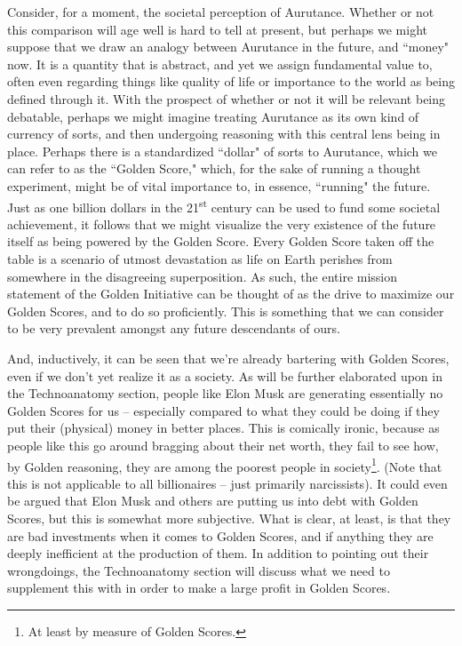 Consider, for a moment, the societal perception of Aurutance. Whether or not this comparison will age well is hard to tell at present, but perhaps we might suppose that we draw an analogy between Aurutance in the future, and ``money" now. It is a quantity that is abstract, and yet we assign fundamental value to, often even regarding things like quality of life or importance to the world as being defined through it. With the prospect of whether or not it will be relevant being debatable, perhaps we might imagine treating Aurutance as its own kind of currency of sorts, and then undergoing reasoning with this central lens being in place. Perhaps there is a standardized ``dollar" of sorts to Aurutance, which we can refer to as the ``Golden Score," which, for the sake of running a thought experiment, might be of vital importance to, in essence, ``running" the future. Just as one billion dollars in the 21\textsuperscript{st} century can be used to fund some societal achievement, it follows that we might visualize the very existence of the future itself as being powered by the Golden Score. Every Golden Score taken off the table is a scenario of utmost devastation as life on Earth perishes from somewhere in the disagreeing superposition. As such, the entire mission statement of the Golden Initiative can be thought of as the drive to maximize our Golden Scores, and to do so proficiently. This is something that we can consider to be very prevalent amongst any future descendants of ours. 

And, inductively, it can be seen that we’re already bartering with Golden Scores, even if we don’t yet realize it as a society. As will be further elaborated upon in the Technoanatomy section, people like Elon Musk are generating essentially no Golden Scores for us -- especially compared to what they could be doing if they put their (physical) money in better places. This is comically ironic, because as people like this go around bragging about their net worth, they fail to see how, by Golden reasoning, they are among the poorest people in society\footnote{At least by measure of Golden Scores.}. (Note that this is not applicable to all billionaires -- just primarily narcissists). It could even be argued that Elon Musk and others are putting us into debt with Golden Scores, but this is somewhat more subjective. What is clear, at least, is that they are bad investments when it comes to Golden Scores, and if anything they are deeply inefficient at the production of them. In addition to pointing out their wrongdoings, the Technoanatomy section will discuss what we need to supplement this with in order to make a large profit in Golden Scores. 

